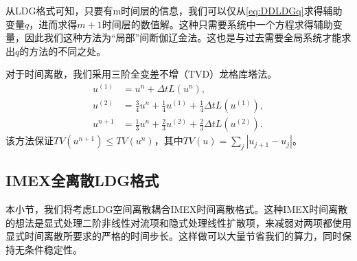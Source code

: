 从LDG格式可知，只要有m时间层的信息，我们可以仅从\eqref{eq:DDLDGq}求得辅助变量$q$，进而求得$m+1$时间层的数值解。这种只需要系统中一个方程求得辅助变量，因此我们这种方法为“局部”间断伽辽金法。这也是与过去需要全局系统才能求出$q$的方法的不同之处。

对于时间离散，我们采用三阶全变差不增（TVD）龙格库塔法。
\begin{align}
    u^{(1)} & = u^n + \Delta t L(u^n),                                                \\
    u^{(2)} & = \frac{3}{4}u^n + \frac{1}{4}u^{(1)} + \frac{1}{4}\Delta t L(u^{(1)}), \\
    u^{n+1} & = \frac{1}{3}u^n + \frac{2}{3}u^{(2)} + \frac{2}{3}\Delta t L(u^{(2)}).
\end{align}
该方法保证$TV(u^{n+1})\leq TV(u^n)$，其中$TV(u) = \sum_j |u_{j+1}-u_j|$。
\subsection{IMEX全离散LDG格式}
本小节，我们将考虑LDG空间离散耦合IMEX时间离散格式。这种IMEX时间离散的想法是显式处理二阶非线性对流项和隐式处理线性扩散项，来减弱对两项都使用显式时间离散所要求的严格的时间步长。这样做可以大量节省我们的算力，同时保持无条件稳定性。

